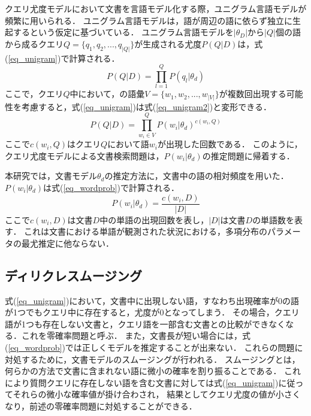 クエリ尤度モデルにおいて文書を言語モデル化する際，ユニグラム言語モデルが頻繁に用いられる．
ユニグラム言語モデルは，語が周辺の語に依らず独立に生起するという仮定に基づいている．
ユニグラム言語モデルを$|\theta_D|$から$|Q|$個の語から成るクエリ$Q = \{q_1, q_2, ..., q_|Q|\}$が生成される尤度$P(Q|D)$は，式(\ref{eq_unigram})で計算される．
\begin{equation}
    P(Q|D) = \prod^{Q}_{l=1}P(q_l|\theta_d) \label{eq_unigram}
\end{equation}
ここで，クエリ$Q$中において，の語彙$V = \{w_1, w_2, ..., w_|V|\}$が複数回出現する可能性を考慮すると，式(\ref{eq_unigram})は式(\ref{eq_unigram2})と変形できる．
\begin{equation}
    P(Q|D) = \prod^{Q}_{w_i \in V}P(w_i|\theta_d)^{c(w_i, Q)} \label{eq_unigram2}
\end{equation}
ここで$c(w_i, Q)$はクエリ$Q$において語$w_i$が出現した回数である．
このように，クエリ尤度モデルによる文書検索問題は，$P(w_i|\theta_d)$の推定問題に帰着する．

本研究では，文書モデル$\theta_d$の推定方法に，文書中の語の相対頻度を用いた．
$P(w_i|\theta_d)$は式(\ref{eq_wordprob})で計算される．
\begin{equation}
    P(w_i|\theta_d) = \frac{c(w_i,D)}{|D|}    \label{eq_wordprob}
\end{equation}
ここで$c(w_i,D)$は文書$D$中の単語の出現回数を表し，$|D|$は文書$D$の単語数を表す．
これは文書における単語が観測された状況における，多項分布のパラメータの最尤推定に他ならない．

\subsection{ディリクレスムージング}  \label{sec_dirichlet}
式(\ref{eq_unigram})において，文書中に出現しない語，すなわち出現確率が0の語が1つでもクエリ中に存在すると，尤度が0となってしまう．
その場合，クエリ語が1つも存在しない文書と，クエリ語を一部含む文書との比較ができなくなる．これを零確率問題と呼ぶ．
また，文書長が短い場合には，式(\ref{eq_wordprob})では正しくモデルを推定することが出来ない．
これらの問題に対処するために，文書モデルのスムージングが行われる．
スムージングとは，何らかの方法で文書に含まれない語に微小の確率を割り振ることである．
これにより質問クエリに存在しない語を含む文書に対しては式(\ref{eq_unigram})に従ってそれらの微小な確率値が掛け合わされ，
結果としてクエリ尤度の値が小さくなり，前述の零確率問題に対処することができる．

